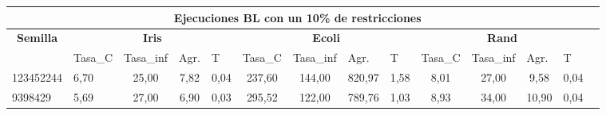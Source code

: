 \documentclass[12pt, spanish]{article}
\begin{document}
\begin{table}[H]
\small

\begin{adjustwidth}{-1cm}{-1cm}%

\begin{tabular}{|l|l|c|c|c|c|c|c|c|c|c|c|c|c|}
\hline
\multicolumn{13}{|c|}{\textbf{Ejecuciones BL con un 10\% de restricciones}}                                                                                                                                                                                                                                                                                                                                                     \\ \hline
\multicolumn{1}{|c|}{\multirow{2}{*}{\textbf{Semilla}}} & \multicolumn{4}{c|}{\textbf{Iris}}                                                                                 & \multicolumn{4}{c|}{\textbf{Ecoli}}                                                                                & \multicolumn{4}{c|}{\textbf{Rand}}                                                                                 \\ \cline{2-13} 
\multicolumn{1}{|c|}{}                                  & \multicolumn{1}{l|}{Tasa\_C} & \multicolumn{1}{l|}{Tasa\_inf} & \multicolumn{1}{l|}{Agr.} & \multicolumn{1}{l|}{T} & \multicolumn{1}{l|}{Tasa\_C} & \multicolumn{1}{l|}{Tasa\_inf} & \multicolumn{1}{l|}{Agr.} & \multicolumn{1}{l|}{T} & \multicolumn{1}{l|}{Tasa\_C} & \multicolumn{1}{l|}{Tasa\_inf} & \multicolumn{1}{l|}{Agr.} & \multicolumn{1}{l|}{T} \\ \hline
123452244                                               & 6,70                         & 25,00                          & 7,82                      & 0,04                   & 237,60                       & 144,00                         & 820,97                    & 1,58                   & 8,01                         & 27,00                          & 9,58                      & 0,04                   \\ \hline
9398429                                                 & 5,69                         & 27,00                          & 6,90                      & 0,03                   & 295,52                       & 122,00                         & 789,76                    & 1,03                   & 8,93                         & 34,00                          & 10,90                     & 0,04                   \\ \hline

\end{tabular}
\end{adjustwidth}
\end{table}
\end{document}
